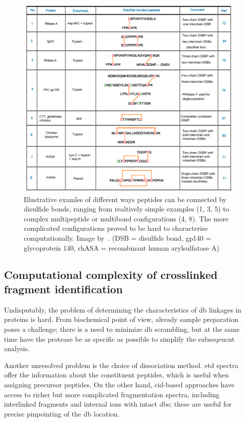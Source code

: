 \begin{figure}
  \centering
  \includegraphics[width=1\linewidth]{img/bond-types.png}
  \caption{Illustrative examles of different ways peptides can be connected by disulfide bonds, ranging from realtively simple examples (1, 3, 5) to complex multipeptide or multibond configurations (4, 8). The more complicated configurations proved to be hard to characterise computationally. Image by~\citet{lakbub2018recent}. (DSB = disulfide bond, gp140 = glycoprotein 140, rhASA = recombinant human arylsulfatase A)}\label{fig:bond-types}
\end{figure}


\subsection{Computational complexity of crosslinked fragment identification}

Undisputably, the problem of determining the characteristics of \gls*{db} linkages in proteins is hard. From biochemical point of view, already sample preparation poses a challenge; there is a need to minimize \gls*{db} scrambling, but at the same time have the protease be as specific as possible to simplify the subseqeucnt analysis.

Another unresolved problem is the choice of dissociation method. \gls*{etd} spectra offer the information about the constituent peptides, which is useful when assigning precursor peptides. On the other hand, \gls*{cid}-based approaches have access to richer but more complicated fragmentation spectra, including interlinked fragments and internal ions with intact \glspl*{db}; these are useful for precise pinpointing of the \gls*{db} location.

